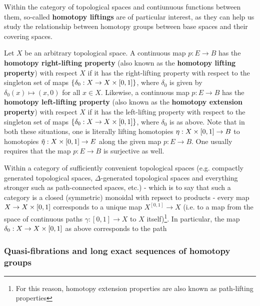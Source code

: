                 \begin{example} \label{example: liftings_of_topological_spaces}
                    Within the category of topological spaces and contiunuous functions between them, so-called \textbf{homotopy liftings} are of particular interest, as they can help us study the relationship between homotopy groups between base spaces and their covering spaces.
                    
                    Let $X$ be an arbitrary topological space. A continuous map $p: E \to B$ has the \textbf{homotopy right-lifting property} (also known as the \textbf{homotopy lifting property}) with respect $X$ if it has the right-lifting property with respect to the singleton set of maps $\{\delta_0: X \to X \x [0, 1]\}$, where $\delta_0$ is given by $\delta_0(x) \mapsto (x, 0)$ for all $x \in X$. Likewise, a continuous map $p: E \to B$ has the \textbf{homotopy left-lifting property} (also known as the \textbf{homotopy extension property}) with respect $X$ if it has the left-lifting property with respect to the singleton set of maps $\{\delta_0: X \to X \x [0, 1]\}$, where $\delta_0$ is as above. Note that in both these situations, one is literally lifting homotopies $\eta: X \x [0, 1] \to B$ to homotopies $\tilde{\eta}: X \x [0, 1] \to E$ along the given map $p: E \to B$. One usually requires that the map $p: E \to B$ is surjective as well.
                    
                    Within a category of sufficiently convenient topological spaces (e.g. compactly generated topological spaces, $\Delta$-generated topological spaces and everything stronger such as path-connected spaces, etc.) - which is to say that such a category is a closed (symmetric) monoidal with repsect to products - every map $X \to X \x [0, 1]$ corresponds to a unique map $X^{[0, 1]} \to X$ (i.e. to a map from the space of continuous paths $\gamma: [0, 1] \to X$ to $X$ itself)\footnote{For this reason, homotopy extension properties are also known as path-lifting properties}. In particular, the map $\delta_0: X \to X \x [0, 1]$ as above corresponds to the path  
                \end{example}
        
            \subsubsection{Quasi-fibrations and long exact sequences of homotopy groups}
                \begin{definition} \label{def: homotopy_groups}
                    
                \end{definition}
                
